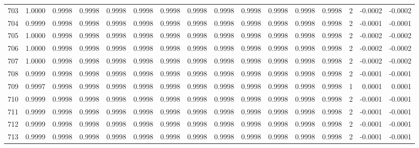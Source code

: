 \begin{tabular}{lrrrrrrrrrrrrrrr}
703 &      1.0000 &  0.9998 &  0.9998 &  0.9998 &  0.9998 &  0.9998 &  0.9998 &  0.9998 &  0.9998 &  0.9998 &   0.9998 &     0.9998 &      2 &                   -0.0002 &                    -0.0002 \\
704 &      0.9999 &  0.9998 &  0.9998 &  0.9998 &  0.9998 &  0.9998 &  0.9998 &  0.9998 &  0.9998 &  0.9998 &   0.9998 &     0.9998 &      2 &                   -0.0001 &                    -0.0001 \\
705 &      1.0000 &  0.9998 &  0.9998 &  0.9998 &  0.9998 &  0.9998 &  0.9998 &  0.9998 &  0.9998 &  0.9998 &   0.9998 &     0.9998 &      2 &                   -0.0002 &                    -0.0002 \\
706 &      1.0000 &  0.9998 &  0.9998 &  0.9998 &  0.9998 &  0.9998 &  0.9998 &  0.9998 &  0.9998 &  0.9998 &   0.9998 &     0.9998 &      2 &                   -0.0002 &                    -0.0002 \\
707 &      1.0000 &  0.9998 &  0.9998 &  0.9998 &  0.9998 &  0.9998 &  0.9998 &  0.9998 &  0.9998 &  0.9998 &   0.9998 &     0.9998 &      2 &                   -0.0002 &                    -0.0002 \\
708 &      0.9999 &  0.9998 &  0.9998 &  0.9998 &  0.9998 &  0.9998 &  0.9998 &  0.9998 &  0.9998 &  0.9998 &   0.9998 &     0.9998 &      2 &                   -0.0001 &                    -0.0001 \\
709 &      0.9997 &  0.9998 &  0.9998 &  0.9998 &  0.9998 &  0.9998 &  0.9998 &  0.9998 &  0.9998 &  0.9998 &   0.9998 &     0.9998 &      1 &                    0.0001 &                     0.0001 \\
710 &      0.9999 &  0.9998 &  0.9998 &  0.9998 &  0.9998 &  0.9998 &  0.9998 &  0.9998 &  0.9998 &  0.9998 &   0.9998 &     0.9998 &      2 &                   -0.0001 &                    -0.0001 \\
711 &      0.9999 &  0.9998 &  0.9998 &  0.9998 &  0.9998 &  0.9998 &  0.9998 &  0.9998 &  0.9998 &  0.9998 &   0.9998 &     0.9998 &      2 &                   -0.0001 &                    -0.0001 \\
712 &      0.9999 &  0.9998 &  0.9998 &  0.9998 &  0.9998 &  0.9998 &  0.9998 &  0.9998 &  0.9998 &  0.9998 &   0.9998 &     0.9998 &      2 &                   -0.0001 &                    -0.0001 \\
713 &      0.9999 &  0.9998 &  0.9998 &  0.9998 &  0.9998 &  0.9998 &  0.9998 &  0.9998 &  0.9998 &  0.9998 &   0.9998 &     0.9998 &      2 &                   -0.0001 &                    -0.0001 \\

\end{tabular}
